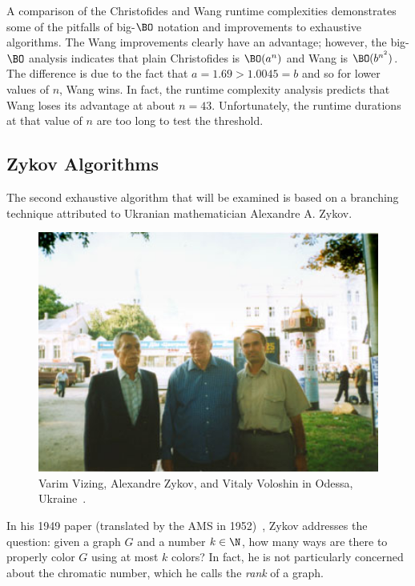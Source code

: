 A comparison of the Christofides and Wang runtime complexities demonstrates some of the pitfalls of big-\(\BO\)
notation and improvements to exhaustive algorithms.  The Wang improvements clearly have an advantage; however, the
big-\(\BO\) analysis indicates that plain Christofides is \(\BO(a^n)\) and Wang is \(\BO(b^{n^2})\).  The difference
is due to the fact that \(a=1.69>1.0045=b\) and so for lower values of \(n\), Wang wins.  In fact, the runtime
complexity analysis predicts that Wang loses its advantage at about \(n=43\).  Unfortunately, the runtime durations
at that value of \(n\) are too long to test the threshold.

\subsection{Zykov Algorithms}\label{sec:sub:zykov}

The second exhaustive algorithm that will be examined is based on a branching technique attributed to Ukranian
mathematician Alexandre A. Zykov.

\begin{figure}[H]
  \centering
  \includegraphics[width=5in]{zykov}
  \caption{Varim Vizing, Alexandre Zykov, and Vitaly Voloshin in Odessa, Ukraine~\cite{voloshin}.}
  \label{fig:pic:zykov}
\end{figure}

In his 1949 paper (translated by the AMS in 1952)~\cite{zykov}, Zykov addresses
the question: given a graph \(G\) and a number \(k\in\N\), how many ways are there to properly color \(G\) using at
most \(k\) colors?  In fact, he is not particularly concerned about the chromatic number, which he calls the
\emph{rank} of a graph.

